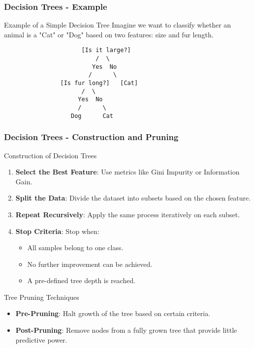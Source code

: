 \documentclass[aspectratio=169]{beamer}
\begin{document}
\begin{frame}[fragile]
    \frametitle{Decision Trees - Example}
    \begin{block}{Example of a Simple Decision Tree}
        Imagine we want to classify whether an animal is a "Cat" or "Dog" based on two features: size and fur length.
        
        \begin{center}
            \begin{verbatim}
                      [Is it large?]
                          /  \
                         Yes  No
                        /      \
                [Is fur long?]   [Cat]
                      /  \
                     Yes  No
                     /      \
                   Dog      Cat
            \end{verbatim}
        \end{center}
    \end{block}
\end{frame}

\begin{frame}[fragile]
    \frametitle{Decision Trees - Construction and Pruning}
    \begin{block}{Construction of Decision Trees}
        \begin{enumerate}
            \item \textbf{Select the Best Feature}: Use metrics like Gini Impurity or Information Gain.
            \item \textbf{Split the Data}: Divide the dataset into subsets based on the chosen feature.
            \item \textbf{Repeat Recursively}: Apply the same process iteratively on each subset.
            \item \textbf{Stop Criteria}: Stop when:
            \begin{itemize}
                \item All samples belong to one class.
                \item No further improvement can be achieved.
                \item A pre-defined tree depth is reached.
            \end{itemize}
        \end{enumerate}
    \end{block}
    
    \begin{block}{Tree Pruning Techniques}
        \begin{itemize}
            \item \textbf{Pre-Pruning}: Halt growth of the tree based on certain criteria.
            \item \textbf{Post-Pruning}: Remove nodes from a fully grown tree that provide little predictive power.
        \end{itemize}
    \end{block}
\end{frame}
\end{document}
